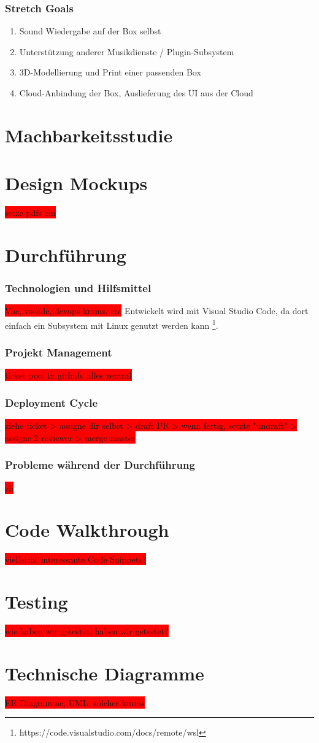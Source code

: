\documentclass[10pt, a4paper, draft]{article}
\begin{document}
\subsubsection{Stretch Goals}
\begin{enumerate}
  \item Sound Wiedergabe auf der Box selbst
  \item Unterstützung anderer Musikdienste / Plugin-Subsystem
  \item 3D-Modellierung und Print einer passenden Box
  \item Cloud-Anbindung der Box, Auslieferung des UI aus der Cloud
\end{enumerate}

\section{Machbarkeitsstudie}

\section{Design Mockups}
\colorbox{red}{setze pdfs ein}

\section{Durchführung}
\subsubsection{Technologien und Hilfsmittel}
\colorbox{red}{Vue, vscode, devops krams, etc}
Entwickelt wird mit Visual Studio Code, da dort einfach ein Subsystem mit Linux genutzt werden kann \footnote{https://code.visualstudio.com/docs/remote/wsl}.

\subsubsection{Projekt Management}
\colorbox{red}{ticket pool in github, alles zentral}

\subsubsection{Deployment Cycle}
\colorbox{red}{ziehe ticket > assigne dir selbst > draft PR > wenn fertig, setzte "undraft" > assigne 2 reviewer > merge master}

\subsubsection{Probleme während der Durchführung}
\colorbox{red}{zb }
\section{Code Walkthrough}
\colorbox{red}{vielleicht interessante Code Snippets?}
\section{Testing}
\colorbox{red}{wie haben wir getestet, haben wir getestet?}
\section{Technische Diagramme}
\colorbox{red}{ER Diagramme, UML, solcher krams}
 
\end{document}
